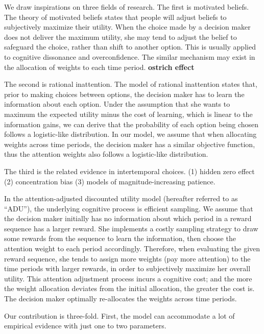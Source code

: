 \documentclass[
  12pt,
]{article}
\begin{document}
We draw inspirations on three fields of research. The first is motivated
beliefs. The theory of motivated beliefs states that people will adjust
beliefs to subjectively maximize their utility. When the choice made by
a decision maker does not deliver the maximum utility, she may tend to
adjust the belief to safeguard the choice, rather than shift to another
option. This is usually applied to cognitive dissonance and
overconfidence. The similar mechanism may exist in the allocation of
weights to each time period. \textbf{ostrich effect}

The second is rational inattention. The model of rational inattention
states that, prior to making choices between options, the decision maker
has to learn the information about each option. Under the assumption
that she wants to maximum the expected utility minus the cost of
learning, which is linear to the information gains, we can derive that
the probability of each option being chosen follows a logistic-like
distribution. In our model, we assume that when allocating weights
across time periods, the decision maker has a similar objective
function, thus the attention weights also follows a logistic-like
distribution.

The third is the related evidence in intertemporal choices. (1) hidden
zero effect (2) concentration bias (3) models of magnitude-increasing
patience.

In the attention-adjusted discounted utility model (hereafter referred
to as ``ADU''), the underlying cognitive process is efficient sampling.
We assume that the decision maker initially has no information about
which period in a reward sequence has a larger reward. She implements a
costly sampling strategy to draw some rewards from the sequence to learn
the information, then choose the attention weight to each period
accordingly. Therefore, when evaluating the given reward sequence, she
tends to assign more weights (pay more attention) to the time periods
with larger rewards, in order to subjectively maximize her overall
utility. This attention adjustment process incurs a cognitive cost; and
the more the weight allocation deviates from the initial allocation, the
greater the cost is. The decision maker optimally re-allocates the
weights across time periods.

Our contribution is three-fold. First, the model can accommodate a lot
of empirical evidence with just one to two parameters.
\end{document}
